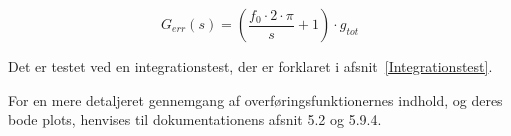 \begin{equation} \label{H_err}
G_{err}(s) = \left(\frac{f_0 \cdot 2\cdot\pi}{s} + 1\right)  \cdot g_{tot}
\end{equation}

Det er testet ved en integrationstest, der er forklaret i afsnit~\ref{Integrationstest}.

For en mere detaljeret gennemgang af overføringsfunktionernes indhold, og deres bode plots, henvises til dokumentationens afsnit 5.2 og 5.9.4.



